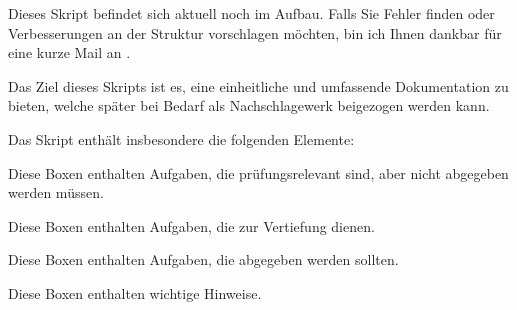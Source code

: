 Dieses Skript befindet sich aktuell noch im Aufbau. Falls Sie Fehler finden oder Verbesserungen an der Struktur
vorschlagen möchten, bin ich Ihnen dankbar für eine kurze Mail an \href{mailto:\mainauthormail}{\mainauthormail}.

Das Ziel dieses Skripts ist es, eine einheitliche und umfassende Dokumentation zu bieten, welche später bei Bedarf als Nachschlagewerk beigezogen werden kann.

Das Skript enthält insbesondere die folgenden Elemente:

\begin{myexercise}
Diese Boxen enthalten Aufgaben, die prüfungsrelevant sind, aber nicht abgegeben werden müssen.
\end{myexercise}

\begin{mychallenge}
Diese Boxen enthalten Aufgaben, die zur Vertiefung dienen.
\end{mychallenge}

\begin{mysubmission}
Diese Boxen enthalten Aufgaben, die abgegeben werden sollten.
\end{mysubmission}

\begin{mycaution}
Diese Boxen enthalten wichtige Hinweise.
\end{mycaution}